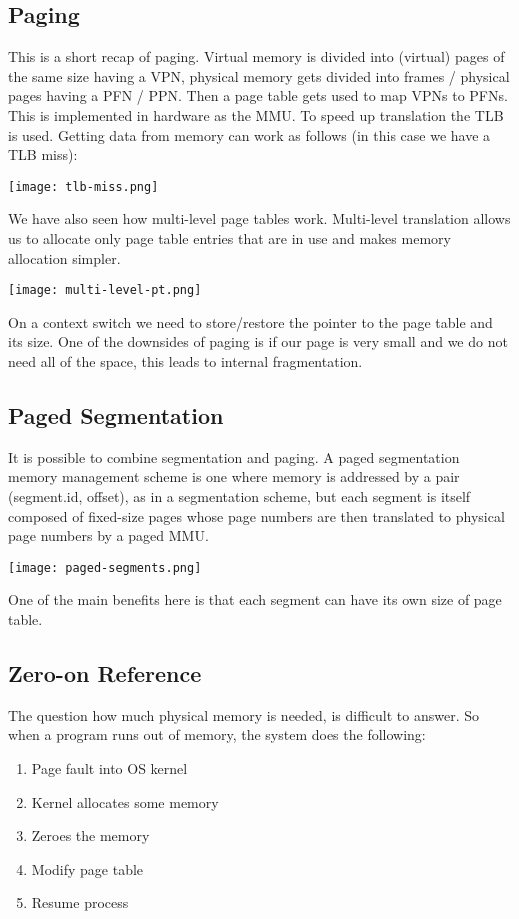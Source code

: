 \subsection{Paging}

This is a short recap of paging. Virtual memory is divided into (virtual) pages of the same size having a VPN, physical memory gets divided into frames / physical pages having a PFN / PPN. Then a page table gets used to map VPNs to PFNs. This is implemented in hardware as the MMU. To speed up translation the TLB is used. Getting data from memory can work as follows (in this case we have a TLB miss):
\begin{center}
	\texttt{[image: tlb-miss.png]}
\end{center}

We have also seen how multi-level page tables work. Multi-level translation allows us to allocate only page table entries that are in use and makes memory allocation simpler.
\begin{center}
	\texttt{[image: multi-level-pt.png]}
\end{center}

On a context switch we need to store/restore the pointer to the page table and its size. One of the downsides of paging is if our page is very small and we do not need all of the space, this leads to internal fragmentation.


\subsection{Paged Segmentation}

It is possible to combine segmentation and paging. A paged segmentation memory management scheme is one where memory is addressed by a pair (segment.id, offset), as in a segmentation scheme, but each segment is itself composed of fixed-size pages whose page numbers are then translated to physical page numbers by a paged MMU.
\begin{center}
	\texttt{[image: paged-segments.png]}
\end{center}

One of the main benefits here is that each segment can have its own size of page table.


\subsection{Zero-on Reference}

The question how much physical memory is needed, is difficult to answer. So when a program runs out of memory, the system does the following:
\begin{enumerate}
	\item Page fault into OS kernel
	\item Kernel allocates some memory
	\item Zeroes the memory
	\item Modify page table
	\item Resume process
\end{enumerate}


